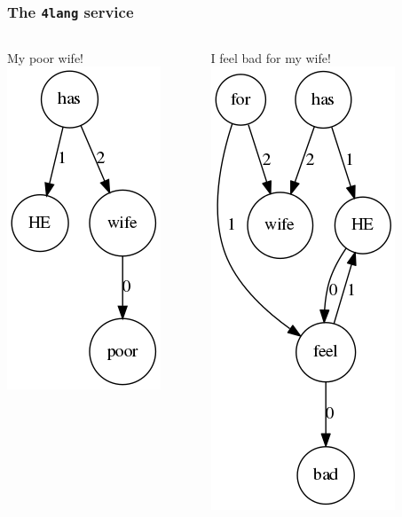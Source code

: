 \documentclass[bigger]{beamer}
\newcommand{\fl}{\texttt{4lang}\xspace}
\begin{document}
\begin{frame}
\frametitle{The \fl service}
\begin{columns}
	\begin{column}{0.3\textwidth}
		\pause My poor wife!
		\pause \includegraphics[scale=0.4]{pics/wifepoor.png}
	\end{column}
	\begin{column}{0.4\textwidth}
		I feel bad for my wife!
		\pause \includegraphics[scale=0.4]{pics/feelbad.png}
	\end{column}
\end{columns}

\end{frame}
\end{document}
